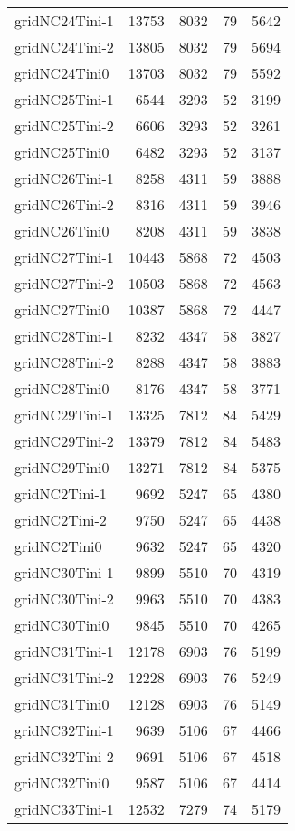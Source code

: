 \documentclass[../../../thesis.tex]{subfiles}
\begin{document}
\begin{longtable}{lrrrr}
gridNC24Tini-1 & 13753 & 8032 & 79 & 5642 \\
gridNC24Tini-2 & 13805 & 8032 & 79 & 5694 \\
gridNC24Tini0 & 13703 & 8032 & 79 & 5592 \\
gridNC25Tini-1 & 6544 & 3293 & 52 & 3199 \\
gridNC25Tini-2 & 6606 & 3293 & 52 & 3261 \\
gridNC25Tini0 & 6482 & 3293 & 52 & 3137 \\
gridNC26Tini-1 & 8258 & 4311 & 59 & 3888 \\
gridNC26Tini-2 & 8316 & 4311 & 59 & 3946 \\
gridNC26Tini0 & 8208 & 4311 & 59 & 3838 \\
gridNC27Tini-1 & 10443 & 5868 & 72 & 4503 \\
gridNC27Tini-2 & 10503 & 5868 & 72 & 4563 \\
gridNC27Tini0 & 10387 & 5868 & 72 & 4447 \\
gridNC28Tini-1 & 8232 & 4347 & 58 & 3827 \\
gridNC28Tini-2 & 8288 & 4347 & 58 & 3883 \\
gridNC28Tini0 & 8176 & 4347 & 58 & 3771 \\
gridNC29Tini-1 & 13325 & 7812 & 84 & 5429 \\
gridNC29Tini-2 & 13379 & 7812 & 84 & 5483 \\
gridNC29Tini0 & 13271 & 7812 & 84 & 5375 \\
gridNC2Tini-1 & 9692 & 5247 & 65 & 4380 \\
gridNC2Tini-2 & 9750 & 5247 & 65 & 4438 \\
gridNC2Tini0 & 9632 & 5247 & 65 & 4320 \\
gridNC30Tini-1 & 9899 & 5510 & 70 & 4319 \\
gridNC30Tini-2 & 9963 & 5510 & 70 & 4383 \\
gridNC30Tini0 & 9845 & 5510 & 70 & 4265 \\
gridNC31Tini-1 & 12178 & 6903 & 76 & 5199 \\
gridNC31Tini-2 & 12228 & 6903 & 76 & 5249 \\
gridNC31Tini0 & 12128 & 6903 & 76 & 5149 \\
gridNC32Tini-1 & 9639 & 5106 & 67 & 4466 \\
gridNC32Tini-2 & 9691 & 5106 & 67 & 4518 \\
gridNC32Tini0 & 9587 & 5106 & 67 & 4414 \\
gridNC33Tini-1 & 12532 & 7279 & 74 & 5179 \\

\end{longtable}
\end{document}
